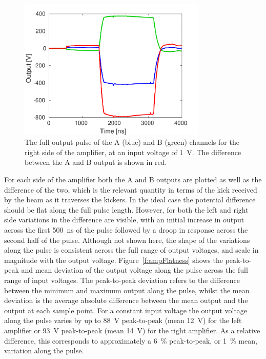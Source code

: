 \begin{figure}
  \centering
  \includegraphics[width=0.8\textwidth]{Figures/commissioning/AmpR_Traces}
  \caption{The full output pulse of the A (blue) and B (green) channels for the right side of the amplifier, at an input voltage of 1~V. The difference between the A and B output is shown in red.}
  \label{f:ampRTraces}
\end{figure}

For each side of the amplifier both the A and B outputs are plotted as well as the difference of the two, which is the relevant quantity in terms of the kick received by the beam as it traverses the kickers. In the ideal case the potential difference should be flat along the full pulse length. However, for both the left and right side variations in the difference are visible, with an initial increase in output across the first 500~ns of the pulse followed by a droop in response across the second half of the pulse. Although not shown here, the shape of the variations along the pulse is consistent across the full range of output voltages, and scale in magnitude with the output voltage. Figure~\ref{f:ampFlatness} shows the peak-to-peak and mean deviation of the output voltage along the pulse across the full range of input voltages. The peak-to-peak deviation refers to the difference between the minimum and maximum output along the pulse, whilst the mean deviation is the average absolute difference between the mean output and the output at each sample point. For a constant input voltage the output voltage along the pulse varies by up to 88~V peak-to-peak (mean 12~V) for the left amplifier or 93~V peak-to-peak (mean 14~V) for the right amplifier. As a relative difference, this corresponds to approximately a 6~\% peak-to-peak, or 1~\% mean, variation along the pulse.

